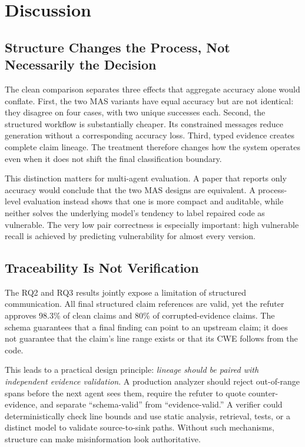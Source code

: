 \section{Discussion}

\subsection{Structure Changes the Process, Not Necessarily the Decision}

The clean comparison separates three effects that aggregate accuracy alone would conflate. First, the two MAS variants have equal accuracy but are not identical: they disagree on four cases, with two unique successes each. Second, the structured workflow is substantially cheaper. Its constrained messages reduce generation without a corresponding accuracy loss. Third, typed evidence creates complete claim lineage. The treatment therefore changes how the system operates even when it does not shift the final classification boundary.

This distinction matters for multi-agent evaluation. A paper that reports only accuracy would conclude that the two MAS designs are equivalent. A process-level evaluation instead shows that one is more compact and auditable, while neither solves the underlying model's tendency to label repaired code as vulnerable. The very low pair correctness is especially important: high vulnerable recall is achieved by predicting vulnerability for almost every version.

\subsection{Traceability Is Not Verification}

The RQ2 and RQ3 results jointly expose a limitation of structured communication. All final structured claim references are valid, yet the refuter approves 98.3\% of clean claims and 80\% of corrupted-evidence claims. The schema guarantees that a final finding can point to an upstream claim; it does not guarantee that the claim's line range exists or that its CWE follows from the code.

This leads to a practical design principle: \emph{lineage should be paired with independent evidence validation}. A production analyzer should reject out-of-range spans before the next agent sees them, require the refuter to quote counter-evidence, and separate ``schema-valid'' from ``evidence-valid.'' A verifier could deterministically check line bounds and use static analysis, retrieval, tests, or a distinct model to validate source-to-sink paths. Without such mechanisms, structure can make misinformation look authoritative.

